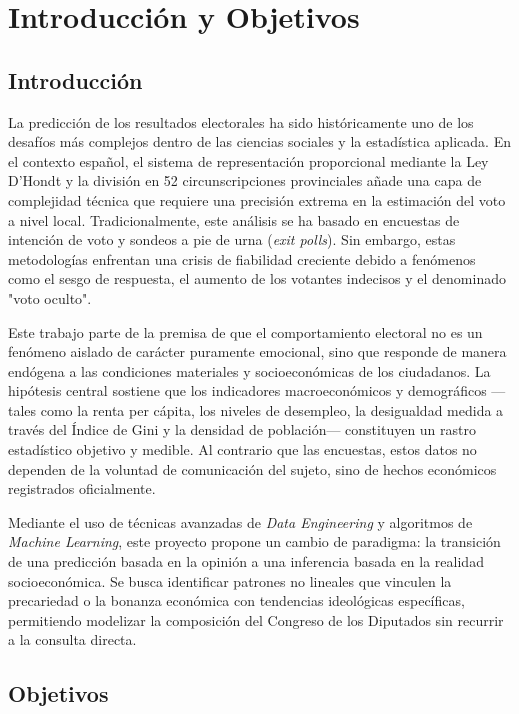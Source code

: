 \chapter{Introducción y Objetivos}

\section{Introducción}

La predicción de los resultados electorales ha sido históricamente uno de los desafíos más complejos dentro de las ciencias sociales y la estadística aplicada. En el contexto español, el sistema de representación proporcional mediante la Ley D'Hondt y la división en 52 circunscripciones provinciales añade una capa de complejidad técnica que requiere una precisión extrema en la estimación del voto a nivel local. Tradicionalmente, este análisis se ha basado en encuestas de intención de voto y sondeos a pie de urna (\textit{exit polls}). Sin embargo, estas metodologías enfrentan una crisis de fiabilidad creciente debido a fenómenos como el sesgo de respuesta, el aumento de los votantes indecisos y el denominado "voto oculto".

Este trabajo parte de la premisa de que el comportamiento electoral no es un fenómeno aislado de carácter puramente emocional, sino que responde de manera endógena a las condiciones materiales y socioeconómicas de los ciudadanos. La hipótesis central sostiene que los indicadores macroeconómicos y demográficos —tales como la renta per cápita, los niveles de desempleo, la desigualdad medida a través del Índice de Gini y la densidad de población— constituyen un rastro estadístico objetivo y medible. Al contrario que las encuestas, estos datos no dependen de la voluntad de comunicación del sujeto, sino de hechos económicos registrados oficialmente.

Mediante el uso de técnicas avanzadas de \textit{Data Engineering} y algoritmos de \textit{Machine Learning}, este proyecto propone un cambio de paradigma: la transición de una predicción basada en la opinión a una inferencia basada en la realidad socioeconómica. Se busca identificar patrones no lineales que vinculen la precariedad o la bonanza económica con tendencias ideológicas específicas, permitiendo modelizar la composición del Congreso de los Diputados sin recurrir a la consulta directa.

\section{Objetivos}

